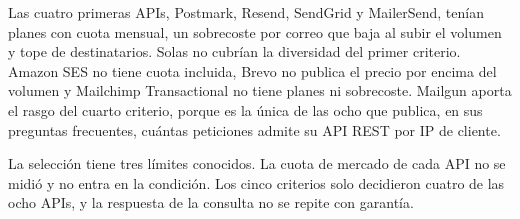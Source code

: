 Las cuatro primeras APIs, Postmark, Resend, SendGrid y MailerSend, tenían planes con cuota mensual, un sobrecoste por correo que baja al subir el volumen y tope de destinatarios.
Solas no cubrían la diversidad del primer criterio.
Amazon SES no tiene cuota incluida, Brevo no publica el precio por encima del volumen y Mailchimp Transactional no tiene planes ni sobrecoste.
Mailgun aporta el rasgo del cuarto criterio, porque es la única de las ocho que publica, en sus preguntas frecuentes, cuántas peticiones admite su API REST por IP de cliente.

La selección tiene tres límites conocidos.
La cuota de mercado de cada API no se midió y no entra en la condición.
Los cinco criterios solo decidieron cuatro de las ocho APIs, y la respuesta de la consulta no se repite con garantía.

